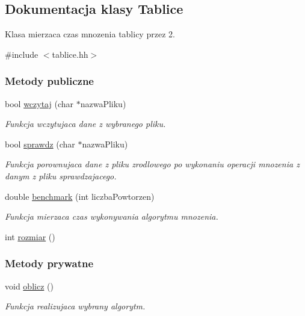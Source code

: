 \hypertarget{class_tablice}{\subsection{Dokumentacja klasy Tablice}
\label{class_tablice}
}


Klasa mierzaca czas mnozenia tablicy przez 2.  




{\ttfamily \#include $<$tablice.\-hh$>$}

\subsubsection*{Metody publiczne}
\begin{DoxyCompactItemize}
\item 
bool \hyperlink{class_tablice_aab1d6df4c268dfd27ab3f3eac119af89}{wczytaj} (char $\ast$nazwa\-Pliku)
\begin{DoxyCompactList}\small\item\em Funkcja wczytujaca dane z wybranego pliku. \end{DoxyCompactList}\item 
bool \hyperlink{class_tablice_ad0dedc4053e77713883e75ba78b0a4fb}{sprawdz} (char $\ast$nazwa\-Pliku)
\begin{DoxyCompactList}\small\item\em Funkcja porownujaca dane z pliku zrodlowego po wykonaniu operacji mnozenia z danym z pliku sprawdzajacego. \end{DoxyCompactList}\item 
double \hyperlink{class_tablice_a3b749bf8fef5c4fe6a067295abf6450a}{benchmark} (int liczba\-Powtorzen)
\begin{DoxyCompactList}\small\item\em Funkcja mierzaca czas wykonywania algorytmu mnozenia. \end{DoxyCompactList}\item 
int \hyperlink{class_tablice_ad2f6b7558d1c0dbbe0dd82d08df27d76}{rozmiar} ()
\end{DoxyCompactItemize}
\subsubsection*{Metody prywatne}
\begin{DoxyCompactItemize}
\item 
void \hyperlink{class_tablice_aee37b03e9711269a41148d5a9e8155d3}{oblicz} ()
\begin{DoxyCompactList}\small\item\em Funkcja realizujaca wybrany algorytm. \end{DoxyCompactList}\end{DoxyCompactItemize}
